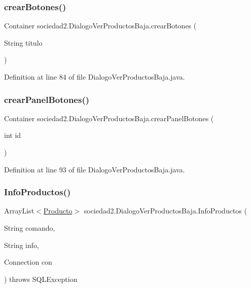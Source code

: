 \subsubsection{\texorpdfstring{crear\+Botones()}{crearBotones()}}
{\footnotesize\ttfamily Container sociedad2.\+Dialogo\+Ver\+Productos\+Baja.\+crear\+Botones (\begin{DoxyParamCaption}\item[{String}]{titulo }\end{DoxyParamCaption})}



Definition at line 84 of file Dialogo\+Ver\+Productos\+Baja.\+java.

\mbox{\label{classsociedad2_1_1_dialogo_ver_productos_baja_a7485030e445c2915f90b38075dddb5a3}} 
\subsubsection{\texorpdfstring{crear\+Panel\+Botones()}{crearPanelBotones()}}
{\footnotesize\ttfamily Container sociedad2.\+Dialogo\+Ver\+Productos\+Baja.\+crear\+Panel\+Botones (\begin{DoxyParamCaption}\item[{int}]{id }\end{DoxyParamCaption})}



Definition at line 93 of file Dialogo\+Ver\+Productos\+Baja.\+java.

\mbox{\label{classsociedad2_1_1_dialogo_ver_productos_baja_a3cebb225abaf25d0171deedb0fc7dab4}} 
\subsubsection{\texorpdfstring{Info\+Productos()}{InfoProductos()}}
{\footnotesize\ttfamily Array\+List$<$\mbox{\hyperlink{classsociedad2_1_1_producto}{Producto}}$>$ sociedad2.\+Dialogo\+Ver\+Productos\+Baja.\+Info\+Productos (\begin{DoxyParamCaption}\item[{String}]{comando,  }\item[{String}]{info,  }\item[{Connection}]{con }\end{DoxyParamCaption}) throws S\+Q\+L\+Exception}



